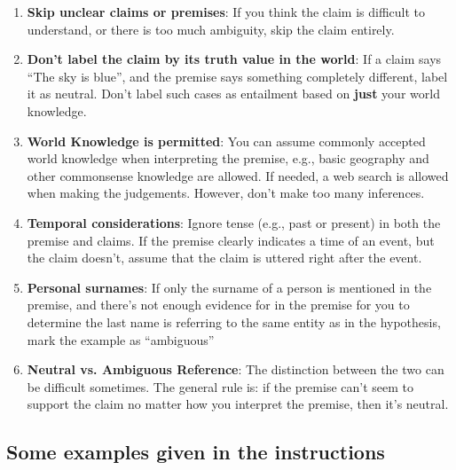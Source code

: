 \begin{enumerate}
    \item \textbf{Skip unclear claims or premises}: If you think the claim is difficult to understand, or there is too much ambiguity, skip the claim entirely.

    \item \textbf{Don’t label the claim by its truth value in the world}: If a claim says “The sky is blue”, and the premise says something completely different, label it as neutral. Don’t label such cases as entailment based on \textbf{just} your world knowledge.

    \item \textbf{World Knowledge is permitted}: You can assume commonly accepted world knowledge when interpreting the premise, e.g., basic geography and other commonsense knowledge are allowed. If needed, a web search is allowed when making the judgements. However, don’t make too many inferences.

    \item \textbf{Temporal considerations}: Ignore tense (e.g., past or present) in both the premise and claims. If the premise clearly indicates a time of an event, but the claim doesn’t, assume that the claim is uttered right after the event.

    \item \textbf{Personal surnames}: If only the surname of a person is mentioned in the premise, and there’s not enough evidence for in the premise for you to determine the last name is referring to the same entity as in the hypothesis, mark the example as ``ambiguous''

    \item \textbf{Neutral vs. Ambiguous Reference}: The distinction between the two can be difficult sometimes. The general rule is: if the premise can’t seem to support the claim no matter how you interpret the premise, then it's neutral.
\end{enumerate}

\subsection*{Some examples given in the instructions}

\newcommand{\instex}[3]{\noindent\textbf{Premise}: #1

\noindent\textbf{Hypothesis}: #2

\noindent\textbf{Label}: #3\vspace{1ex}}

